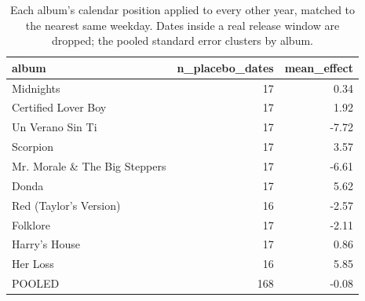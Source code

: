 \begin{table}
\caption{Each album's calendar position applied to every other year, matched to the nearest same weekday. Dates inside a real release window are dropped; the pooled standard error clusters by album.}
\begin{tabular}{lrr}
\toprule
album & n\_placebo\_dates & mean\_effect \\
\midrule
Midnights & 17 & 0.34 \\
Certified Lover Boy & 17 & 1.92 \\
Un Verano Sin Ti & 17 & -7.72 \\
Scorpion & 17 & 3.57 \\
Mr. Morale \& The Big Steppers & 17 & -6.61 \\
Donda & 17 & 5.62 \\
Red (Taylor's Version) & 16 & -2.57 \\
Folklore & 17 & -2.11 \\
Harry's House & 17 & 0.86 \\
Her Loss & 16 & 5.85 \\
POOLED & 168 & -0.08 \\
\bottomrule
\end{tabular}
\end{table}
